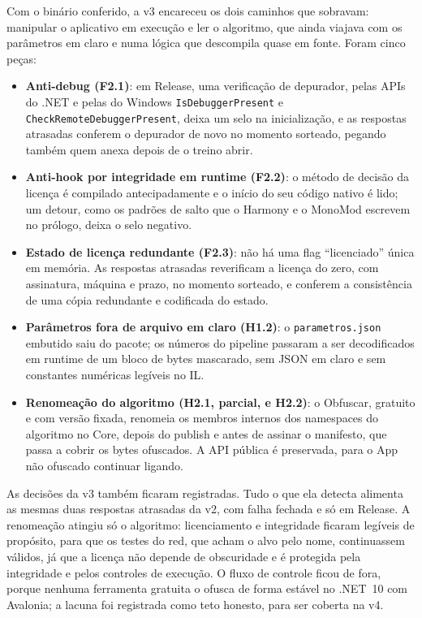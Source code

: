 Com o binário conferido, a v3 encareceu os dois caminhos que sobravam: manipular o aplicativo em execução e ler o algoritmo, que ainda viajava com os parâmetros em claro e numa lógica que descompila quase em fonte. Foram cinco peças:
\begin{itemize}
\item \textbf{Anti-debug (F2.1)}: em Release, uma verificação de depurador, pelas APIs do .NET e pelas do Windows \texttt{IsDebuggerPresent} e \texttt{CheckRemoteDebuggerPresent}, deixa um selo na inicialização, e as respostas atrasadas conferem o depurador de novo no momento sorteado, pegando também quem anexa depois de o treino abrir.
\item \textbf{Anti-hook por integridade em runtime (F2.2)}: o método de decisão da licença é compilado antecipadamente e o início do seu código nativo é lido; um detour, como os padrões de salto que o Harmony e o MonoMod escrevem no prólogo, deixa o selo negativo.
\item \textbf{Estado de licença redundante (F2.3)}: não há uma flag \enquote{licenciado} única em memória. As respostas atrasadas reverificam a licença do zero, com assinatura, máquina e prazo, no momento sorteado, e conferem a consistência de uma cópia redundante e codificada do estado.
\item \textbf{Parâmetros fora de arquivo em claro (H1.2)}: o \texttt{parametros.json} embutido saiu do pacote; os números do pipeline passaram a ser decodificados em runtime de um bloco de bytes mascarado, sem JSON em claro e sem constantes numéricas legíveis no IL.
\item \textbf{Renomeação do algoritmo (H2.1, parcial, e H2.2)}: o Obfuscar, gratuito e com versão fixada, renomeia os membros internos dos namespaces do algoritmo no Core, depois do publish e antes de assinar o manifesto, que passa a cobrir os bytes ofuscados. A API pública é preservada, para o App não ofuscado continuar ligando.
\end{itemize}

As decisões da v3 também ficaram registradas. Tudo o que ela detecta alimenta as mesmas duas respostas atrasadas da v2, com falha fechada e só em Release. A renomeação atingiu só o algoritmo: licenciamento e integridade ficaram legíveis de propósito, para que os testes do red, que acham o alvo pelo nome, continuassem válidos, já que a licença não depende de obscuridade e é protegida pela integridade e pelos controles de execução. O fluxo de controle ficou de fora, porque nenhuma ferramenta gratuita o ofusca de forma estável no .NET~10 com Avalonia; a lacuna foi registrada como teto honesto, para ser coberta na v4.


